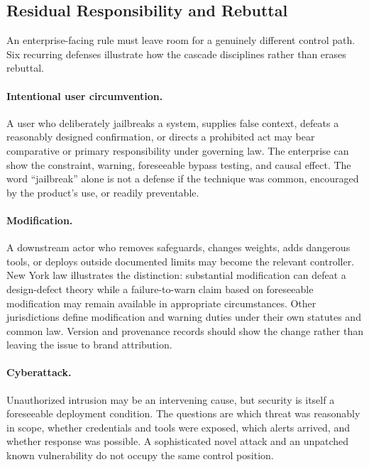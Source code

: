 \subsection{Residual Responsibility and Rebuttal}

An enterprise-facing rule must leave room for a genuinely different control path. Six recurring defenses illustrate how the cascade disciplines rather than erases rebuttal.

\paragraph{Intentional user circumvention.}
A user who deliberately jailbreaks a system, supplies false context, defeats a reasonably designed confirmation, or directs a prohibited act may bear comparative or primary responsibility under governing law. The enterprise can show the constraint, warning, foreseeable bypass testing, and causal effect. The word ``jailbreak'' alone is not a defense if the technique was common, encouraged by the product's use, or readily preventable.

\paragraph{Modification.}
A downstream actor who removes safeguards, changes weights, adds dangerous tools, or deploys outside documented limits may become the relevant controller. New York law illustrates the distinction: substantial modification can defeat a design-defect theory while a failure-to-warn claim based on foreseeable modification may remain available in appropriate circumstances. Other jurisdictions define modification and warning duties under their own statutes and common law. Version and provenance records should show the change rather than leaving the issue to brand attribution.

\paragraph{Cyberattack.}
Unauthorized intrusion may be an intervening cause, but security is itself a foreseeable deployment condition. The questions are which threat was reasonably in scope, whether credentials and tools were exposed, which alerts arrived, and whether response was possible. A sophisticated novel attack and an unpatched known vulnerability do not occupy the same control position.

